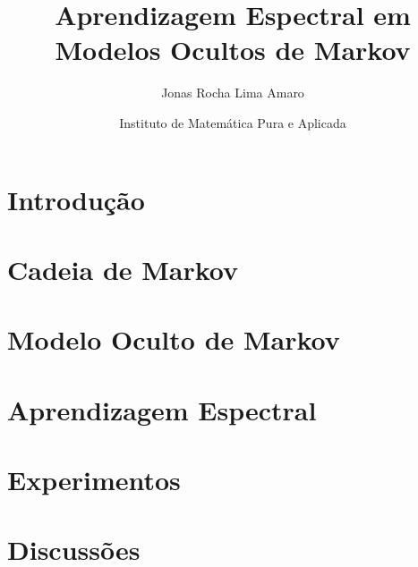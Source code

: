 \documentclass[
	a4paper, %
	10pt, %
	unnumberedsections, %
	twoside, %
]{LTJournalArticle}
\title{Aprendizagem Espectral em Modelos Ocultos de Markov} %
\author{%
	Jonas Rocha Lima Amaro
}
\date{\footnotesize Instituto de Matemática Pura e Aplicada}
\begin{document}
\maketitle %


\section{Introdução}


\section{Cadeia de Markov}


\section{Modelo Oculto de Markov}


\section{Aprendizagem Espectral}


\section{Experimentos}


\section{Discussões}



\printbibliography %

\end{document}
